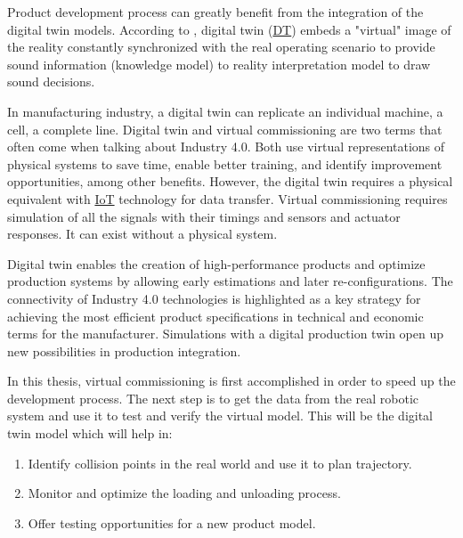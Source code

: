 Product development process can greatly benefit from the integration of
the digital twin models. According to \cite{SEMERARO2021103469}, digital twin (\hyperref[acro:DT]{DT}) embeds a "virtual" image of the reality
constantly synchronized with the real operating scenario to provide sound information (knowledge model) to reality interpretation model to draw sound decisions.

In manufacturing industry, a digital twin can replicate an individual machine, a cell, a complete line. Digital twin and virtual commissioning are two terms that often come when
talking about Industry 4.0. Both use virtual representations of physical systems to save time, enable better training, and identify improvement opportunities, among other benefits. However, the digital twin requires a physical equivalent with \hyperref[acro:IoT]{IoT} technology for data transfer. Virtual commissioning requires simulation of all the signals with their timings and sensors and actuator responses.
It can exist without a physical system. \cite{digitaltwinblog}

Digital twin enables the creation of high-performance products and optimize production systems by allowing early estimations and later re-configurations. The connectivity of Industry 4.0 technologies is highlighted as a key strategy for achieving the most efficient product specifications in technical and economic terms for the manufacturer. 
Simulations with a digital production twin open up new possibilities in production integration.
\cite{WAGNER201988}


In this thesis, virtual commissioning is first accomplished in order to speed up the development process. The next step is to get the data from the real robotic system and use it to test and verify the virtual model.
This will be the digital twin model which will help in:
\begin{enumerate}
    \item Identify collision points in the real world and use it to plan trajectory.
    \item Monitor and optimize the loading and unloading process.
    \item Offer testing opportunities for a new product model.
\end{enumerate}

